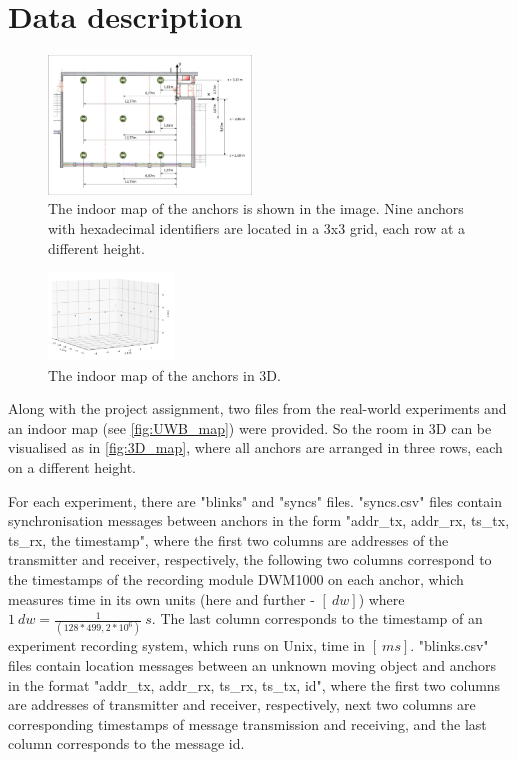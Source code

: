 \documentclass[journal]{IEEEtran}
\begin{document}
\section{Data description}
\label{sec:data_desc}
\begin{figure}[ht]
    \centering
    \includegraphics[width=0.48\textwidth]{graphics/UWB_map.pdf}
    \caption{The indoor map of the anchors is shown in the image. Nine anchors with hexadecimal identifiers are located in a 3x3 grid, each row at a different height.}
    \label{fig:UWB_map}
\end{figure}
\begin{figure}[ht]
    \centering
    \includegraphics[width=0.30\textwidth]{graphics/room3D.png}
    \caption{The indoor map of the anchors in 3D.}
    \label{fig:3D_map}
\end{figure}

Along with the project assignment, two files from the real-world experiments and an indoor map (see \autoref{fig:UWB_map}) were provided. So the room in 3D can be visualised as in \autoref{fig:3D_map}, where all anchors are arranged in three rows, each on a different height.

For each experiment, there are "blinks" and "syncs" files.
"syncs.csv" files contain synchronisation messages between anchors in the form "addr\_tx, addr\_rx, ts\_tx, ts\_rx, the timestamp",  where the first two columns are addresses of the transmitter and receiver, respectively, the following two columns correspond to the timestamps of the recording module DWM1000 on each anchor, which measures time in its own units (here and further - $[\SI{}{dw}]$) where $\SI{1}{dw} = \frac{1}{(128*499,2*10^6)}\SI{}{s}$. 
The last column corresponds to the timestamp of an experiment recording system, which runs on Unix, time in $[\SI{}{ms}]$.
"blinks.csv" files contain location messages between an unknown moving object and anchors in the format "addr\_tx, addr\_rx, ts\_rx, ts\_tx, id", where the first two columns are addresses of transmitter and receiver, respectively, next two columns are corresponding timestamps of message transmission and receiving, and the last column corresponds to the message id.
\end{document}
